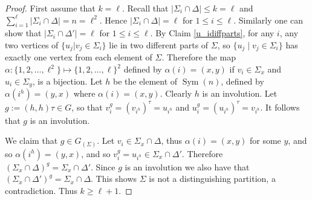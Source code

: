 \documentclass[10pt,a4paper]{amsart}
\DeclareMathOperator{\Diag}{Diag}
\DeclareMathOperator{\Sym}{Sym}
\begin{document}
\begin{proof}
\medskip
First assume that \(k=\ell\).
Recall that \(|\Sigma_{i}\cap\Delta|\leqslant k=\ell\)
and \(\sum_{i=1}^{\ell}|\Sigma_{i}\cap\Delta|=n=\ell^{2}\).
Hence \(|\Sigma_{i}\cap \Delta|=\ell\) for \(1\leqslant i\leq\ell\). 
Similarly one can show that \(|\Sigma_{i}\cap\Delta'|=\ell\) for \(1\leqslant i\leqslant \ell\).
By Claim \ref{u_idiffparts}, for any \(i\), any two vertices of \(\{u_j|v_j\in \Sigma_i\}\) lie in two different parts of \(\Sigma\), so \(\{u_j \mid v_j\in \Sigma_i\}\) has exactly one vertex from each element of \(\Sigma\).
%
%
Therefore the map $\alpha:\{1,2,\ldots,\ell^2\}\mapsto \{1,2,\ldots,\ell\}^2$ defined by $\alpha(i)=(x,y)$ if $v_i\in \Sigma_x$ and $u_i\in \Sigma_y$, is a bijection.
Let $h$ be the element of $\Sym(n)$, defined by $\alpha(i^h)=(y,x)$ where $\alpha(i)=(x,y)$. Clearly $h$ is an involution.
 Let \(g:=(h,h)\tau\in G\), so that  $v_i^g=(v_{i^h})^\tau=u_{i^h}$ and $u_i^g=(u_{i^h})^\tau=v_{i^h}$. It follows that $g$ is an involution.
 
 
 We claim that $g\in G_{({\Sigma})}.$
Let $v_i\in\Sigma_x\cap \Delta$, thus $\alpha(i)=(x,y)$ for some $y$, and so $\alpha(i^h)=(y,x)$, and so $v_i^g=u_{i^h}\in \Sigma_x\cap\Delta'$.
Therefore \((\Sigma_{x}\cap\Delta)^{g}=\Sigma_{x}\cap\Delta'\).
Since \(g \) is an involution we also have that \((\Sigma_{x}\cap\Delta')^{g}=\Sigma_{x}\cap\Delta\).
This shows $\Sigma$ is not a distinguishing partition, a contradiction.  Thus
\(k\geqslant \ell+1\).








\end{proof}
\end{document}

